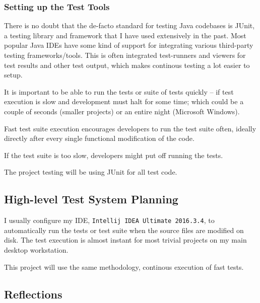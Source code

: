%
%

\subsubsection{Setting up the Test Tools}
There is no doubt that the de-facto standard for testing Java codebases is
JUnit\cite{tools:junit}, a testing library and framework that I have used
extensively in the past.
Most popular Java IDEs have some kind of support for integrating various
third-party testing frameworks/tools. 
This is often integrated test-runners and viewers for test results and other
test output, which makes continous testing a lot easier to setup.

It is important to be able to run the tests or suite of tests quickly --
if test execution is slow and development must halt for some time; which could
be a couple of seconds (smaller projects) or an entire night (Microsoft Windows).

Fast test suite execution encourages developers to run the test suite often,
ideally directly after every single functional modification of the code.

If the test suite is too slow, developers might put off running the tests.




The project testing will be using JUnit for all test code. 


\subsection{High-level Test System Planning}
I usually configure my IDE, \texttt{Intellij IDEA Ultimate 2016.3.4}, to
automatically run the tests or test suite when the source files are modified on
disk. The test execution is almost instant for most trivial projects on my main
desktop workstation.

This project will use the same methodology, continous execution of fast tests.



%



\subsection{Reflections}\label{task-1c-reflect}

